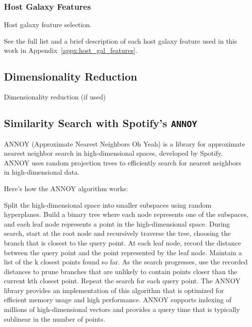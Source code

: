 \documentclass[twocolumn]{aastex63}
\newcommand{\annoy}{\texttt{ANNOY}}
\begin{document}
\subsubsection{Host Galaxy Features} \label{subsubsec:host_features}

Host galaxy feature selection. \par

See the full list and a brief description of each host galaxy feature used in this work in Appendix~\ref{appx:host_gal_features}.

\subsection{Dimensionality Reduction} \label{subsec:dim_reduce}

Dimensionality reduction (if used) \par


\subsection{Similarity Search with Spotify's \annoy{}} \label{subsec:annoy}

ANNOY (Approximate Nearest Neighbors Oh Yeah) is a library for approximate nearest neighbor search in high-dimensional spaces, developed by Spotify. ANNOY uses random projection trees to efficiently search for nearest neighbors in high-dimensional data.

Here's how the ANNOY algorithm works:

Split the high-dimensional space into smaller subspaces using random hyperplanes.
Build a binary tree where each node represents one of the subspaces, and each leaf node represents a point in the high-dimensional space.
During search, start at the root node and recursively traverse the tree, choosing the branch that is closest to the query point.
At each leaf node, record the distance between the query point and the point represented by the leaf node.
Maintain a list of the k closest points found so far.
As the search progresses, use the recorded distances to prune branches that are unlikely to contain points closer than the current kth closest point.
Repeat the search for each query point.
The ANNOY library provides an implementation of this algorithm that is optimized for efficient memory usage and high performance. ANNOY supports indexing of millions of high-dimensional vectors and provides a query time that is typically sublinear in the number of points.
\end{document}
